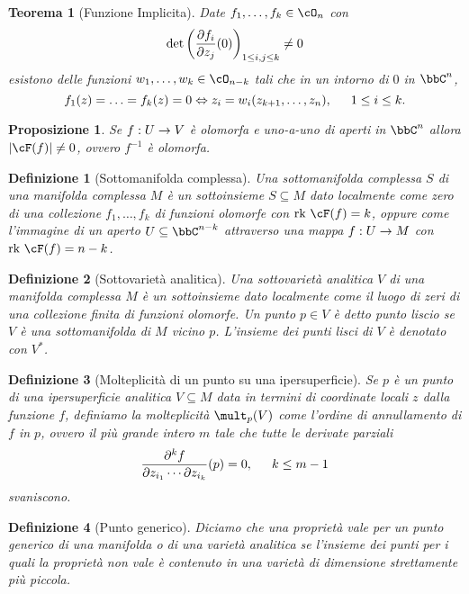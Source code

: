 \documentclass[a4paper,11pt]{article}
\newtheorem{teorema}{Teorema}
\newtheorem{definizione}{Definizione}
\newtheorem{proposizione}{Proposizione}
\begin{document}
\begin{teorema}[Funzione Implicita]
  Date $f_1, \ldots, f_k \in \cO_n$ con
  $$ \det \lrt{\dpar{f_i}{z_j} (0)}_{1 \le i, j \le k} \neq 0 $$
  esistono delle funzioni $w_1, \ldots, w_k \in \cO_{n-k}$ tali che in un intorno di $0$ in $\bbC^n$,
  $$ f_1(z) = \ldots = f_k(z) = 0 \Leftrightarrow z_i = w_i(z_{k+1}, \ldots, z_n), \hskip 1.5em 1 \le i \le k. $$
\end{teorema}

\begin{proposizione}
  Se $f: U \rightarrow V$ è olomorfa e uno-a-uno di aperti in $\bbC^n$ allora $\abs{\cF(f)} \neq 0$, ovvero $f^{-1}$ è olomorfa.
\end{proposizione}

\begin{definizione}[Sottomanifolda complessa]
  Una sottomanifolda complessa $S$ di una manifolda complessa $M$ è un sottoinsieme $S \subseteq M$ dato localmente come zero di una collezione $f_1, \ldots, f_k$ di funzioni olomorfe con $\Rk \cF(f) = k$, oppure come l'immagine di un aperto $U \subseteq \bbC^{n-k}$ attraverso una mappa $f: U \rightarrow M$ con $\Rk \cF(f) = n - k$.
\end{definizione}

\begin{definizione}[Sottovarietà analitica]
  Una sottovarietà analitica $V$ di una manifolda complessa $M$ è un sottoinsieme dato localmente come il luogo di zeri di una collezione finita di funzioni olomorfe.
  Un punto $p \in V$ è detto punto liscio se $V$ è una sottomanifolda di $M$ vicino $p$.
  L'insieme dei punti lisci di $V$ è denotato con $V^*$.
\end{definizione}

\begin{definizione}[Molteplicità di un punto su una ipersuperficie]
  Se $p$ è un punto di una ipersuperficie analitica $V \subseteq M$ data in termini di coordinate locali $z$ dalla funzione $f$, definiamo la molteplicità $\mult_p (V)$ come l'ordine di annullamento di $f$ in $p$, ovvero il più grande intero $m$ tale che tutte le derivate parziali
  $$ \frac{\partial^k f}{\partial z_{i_1} \cdots \partial z_{i_k}} (p) = 0, \hskip 1.5em k \le m - 1 $$
  svaniscono.
\end{definizione}

\begin{definizione}[Punto generico]
  Diciamo che una proprietà vale per un punto generico di una manifolda o di una varietà analitica se l'insieme dei punti per i quali la proprietà non vale è contenuto in una varietà di dimensione strettamente più piccola.
\end{definizione}
\end{document}
